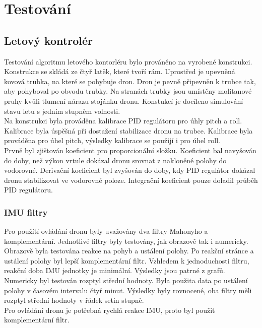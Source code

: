 \chapter{Testování}
\label{6-testovani}

\section{Letový kontrolér}
Testování algoritmu letového kontorléru bylo prováněno na vyrobené konstrukci. Konstrukce se skládá ze čtyř latěk, které tvoří rám. Uprostřed je upevněná kovová trubka, na které se pohybuje dron. Dron je pevně připevněn k trubce tak, aby pohyboval po obvodu trubky. Na stranách trubky jsou umístěny molitanové pruhy kvůli tlumení nárazu stojánku dronu. Konstukcí je docíleno simulování stavu letu s jedním stupněm volnosti. \\
Na konstrukci byla prováděna kalibrace PID regulátoru pro úhly pitch a roll. Kalibrace byla úspěšná při dostažení stabilizace dronu na trubce. Kalibrace byla prováděna pro úhel pitch, výsledky kalibrace se použijí i pro úhel roll.\\
Prvně byl zjištován koeficient pro proporcionální složku. Koeficient bal navyšován do doby, než výkon vrtule dokázal dronu srovnat z nakloněné polohy do vodorovné. Derivační koeficient byl zvyšován do doby, kdy PID regulátor dokázal dronu stabilizovat ve vodorovné poloze. Integrační koeficient pouze doladil průběh PID regulátoru.\\

\subsection{IMU filtry}
Pro použítí ovládání dronu byly uvažovány dva filtry Mahonyho a komplementární. Jednotlivé filtry byly testovány, jak obrazově tak i numericky.\\
Obrazově byla testována reakce na pohyb a ustálení polohy.
Po reakční stránce a ustálení  polohy byl lepší komplementární filtr. Vzhledem k jednoduchosti filtru, reakční doba IMU jednotky je minimální. Výsledky jsou patrné z grafů.\\
Numericky byl testován rozptyl střední hodnoty. Byla použita data po ustálení polohy v časovém intervalu čtyř minut. Výsledky byly rovnocené, oba filtry měli rozptyl střední hodnoty v řádek setin stupně.\\
Pro ovládání dronu je potřebná rychlá reakce IMU, proto byl použit komplementární filtr.\\

